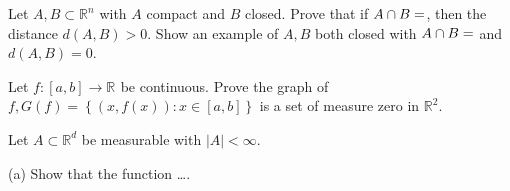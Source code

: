 
\begin{problem}{1}
  Let $A,B \subset \mathbb{R}^{n}$ with $A$ compact and $B$ closed. Prove that if $A \cap B = \empty$, then the distance $d(A,B) > 0$.
  Show an example of $A,B$ both closed with $A \cap B = \empty$ and $d(A,B) = 0$.
\end{problem} 

\begin{solution}
  

  
\end{solution}

\begin{problem}{2}
  Let $ f : [a,b] \to \mathbb{R}^{} $ be continuous. Prove the graph of $f, G(f) = \left\{ (x,f(x)) : x \in [a,b] \right\}$ is a set of measure zero in $\mathbb{R}^{2}$.
\end{problem}
    
\begin{solution}
\end{solution}

\begin{problem}{3}
Let $A \subset \mathbb{R}^{d}$ be measurable with $|A| < \infty$.

(a) Show that the function \ldots.
\end{problem}

\begin{solution}
\end{solution}
